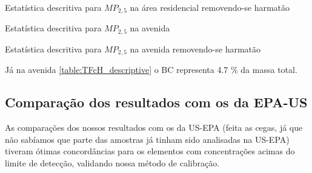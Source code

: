 \begin{table}[H]
  \centering
    
  \caption{Estatística descritiva para $MP_{2,5}$ na área residencial
           removendo-se harmatão \label{table:RFsH_descriptive}}
\end{table}

\begin{table}[H]
  \centering
    
  \caption{Estatística descritiva para $MP_{2,5}$ na avenida
            \label{table:TFcH_descriptive}}
\end{table}

\begin{table}[H]
  \centering
    
  \caption{Estatística descritiva para $MP_{2,5}$ na avenida
           removendo-se harmatão \label{table:TFsH_descriptive}}
\end{table}


Já na avenida \ref{table:TFcH_descriptive} o BC
representa 4.7 \% da massa total.

%    


\subsection{Comparação dos resultados com os da EPA-US}

As comparações dos nossos resultados com os da US-EPA (feita as cegas, já que não sabíamos que parte das amostras já tinham sido analisadas na US-EPA) tiveram ótimas concordâncias para os elementos com concentrações acimas do limite de detecção, validando nossa método de calibração.  

